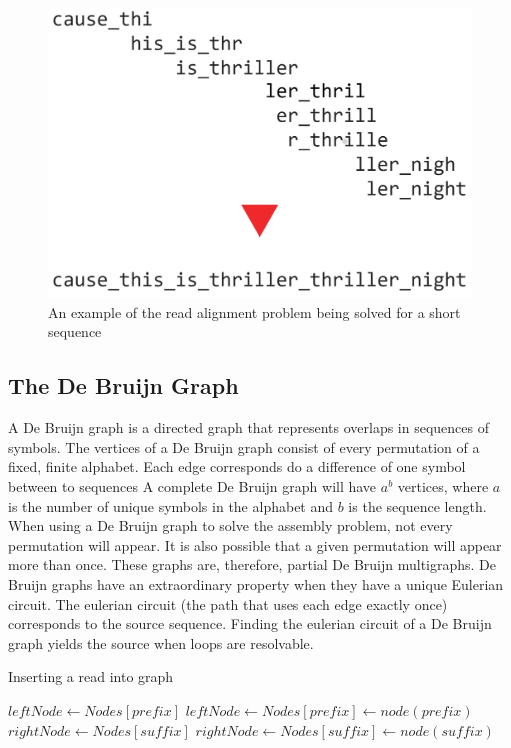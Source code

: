 \documentclass[letterpaper, 10 pt]{ieeeconf}
\begin{document}
\begin{figure}[thpb]
    \includegraphics[scale=0.3]{images/fig1-2.jpg}
    \caption{An example of the read alignment problem being solved for a short sequence}
    \label{fig1}
  \end{figure}

  \subsection{The De Bruijn Graph}
  A De Bruijn graph is a directed graph that represents overlaps in sequences 
  of symbols.  The vertices of a De Bruijn graph consist of every permutation 
  of a fixed, finite alphabet.  Each edge corresponds do a difference of one 
  symbol between to sequences  A complete De Bruijn graph will have $a^b$ 
  vertices, where $a$ is the number of unique symbols in the alphabet and $b$ 
  is the sequence length\cite{wikipedia}. When using a De Bruijn graph to
  solve the assembly problem, not every permutation will appear.  It is also 
  possible that a given permutation will appear more than once. These graphs 
  are, therefore, partial De Bruijn multigraphs. De Bruijn graphs have an 
  extraordinary property when they have a unique Eulerian circuit. The
  eulerian circuit (the path that uses each edge exactly once) corresponds to
  the source sequence.  Finding the eulerian circuit of a De Bruijn graph 
  yields the source when loops are resolvable.

  \begin{algorithm}
    \caption{Inserting a read into graph}
    \begin{algorithmic}
        \STATE $leftNode \leftarrow Nodes[prefix]$
      \ELSE
        \STATE $leftNode \leftarrow Nodes[prefix] \leftarrow node(prefix)$
      \ENDIF
        \STATE $rightNode \leftarrow Nodes[suffix]$
      \ELSE
        \STATE $rightNode \leftarrow Nodes[suffix] \leftarrow node(suffix)$
      \ENDIF
    \end{algorithmic}
  \end{algorithm}
\end{document}
